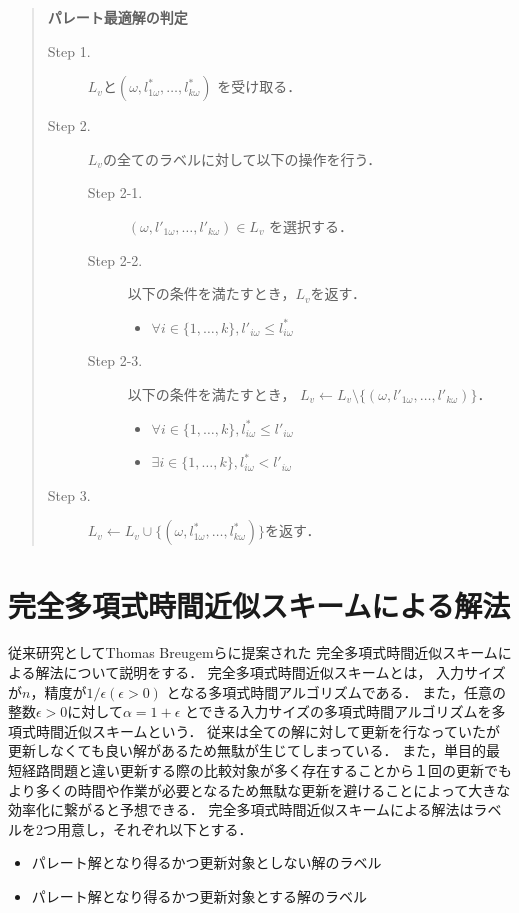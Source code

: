 \documentclass[12pt]{optlab-bachelor}
\begin{document}
\begin{quote}
  \textbf{パレート最適解の判定}
  \begin{description}
    \item[Step 1.] $L_v$と$(\omega,l^*_{1\omega},\ldots,l^*_{k\omega})$
    を受け取る．
    \item[Step 2.] $L_v$の全てのラベルに対して以下の操作を行う．
    \begin{description}
    \item[Step 2-1.] $(\omega,l'_{1\omega},\ldots,l'_{k\omega}) \in L_v$
    を選択する．
    \item[Step 2-2.] 以下の条件を満たすとき，$L_v$を返す．
    \begin{itemize}
      \item $\forall i \in \{1,\ldots,k\},l'_{i\omega} \le l^*_{i\omega}$
    \end{itemize}
    \item[Step 2-3.] 以下の条件を満たすとき，
    $L_v \leftarrow L_v \setminus \{(\omega,l'_{1\omega},\ldots,l'_{k\omega})\}$．
    \begin{itemize}
      \item $\forall i \in \{1,\ldots,k\},l^*_{i\omega} \le l'_{i\omega}$
      \item $\exists i \in \{1,\ldots,k\},l^*_{i\omega} < l'_{i\omega}$
    \end{itemize}
    \end{description}
    \item[Step 3.]
    $L_v \leftarrow L_v \cup \{(\omega,l^*_{1\omega},\ldots,l^*_{k\omega})\}$を返す．
  \end{description}
\end{quote}

\section{完全多項式時間近似スキームによる解法}
従来研究としてThomas Breugemら\cite{Breugem}に提案された
完全多項式時間近似スキームによる解法について説明をする．
完全多項式時間近似スキームとは，
入力サイズが$n$，精度が$1 / \epsilon(\epsilon > 0)$
となる多項式時間アルゴリズムである．
また，任意の整数$\epsilon > 0$に対して$\alpha = 1+\epsilon$
とできる入力サイズの多項式時間アルゴリズムを多項式時間近似スキームという．
従来は全ての解に対して更新を行なっていたが更新しなくても良い解があるため無駄が生じてしまっている．
また，単目的最短経路問題と違い更新する際の比較対象が多く存在することから１回の更新でも
より多くの時間や作業が必要となるため無駄な更新を避けることによって大きな効率化に繋がると予想できる．
完全多項式時間近似スキームによる解法はラベルを2つ用意し，それぞれ以下とする．
\begin{itemize}
\item パレート解となり得るかつ更新対象としない解のラベル
\item パレート解となり得るかつ更新対象とする解のラベル
\end{itemize}
\end{document}
